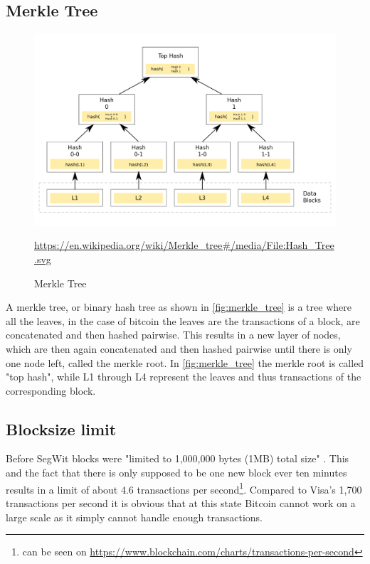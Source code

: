 \subsection{Merkle Tree}
\label{sec:Basics:MerkleTree}
\begin{figure}[!ht]
    \centering
    \includegraphics[width=(\textwidth * 2 / 3 )]{Ausarbeitung/images/merkle_tree.png}
    \caption[Merkle Tree]{Merkle Tree}
    \small \url{https://en.wikipedia.org/wiki/Merkle_tree#/media/File:Hash_Tree.svg} 
    \label{fig:merkle_tree}
\end{figure}
A merkle tree, or binary hash tree as shown in \autoref{fig:merkle_tree} is a tree where all the leaves, in the case of bitcoin the leaves are the transactions of a block, are concatenated and then hashed pairwise. This results in a new layer of nodes, which are then again concatenated and then hashed pairwise until there is only one node left, called the merkle root. In \autoref{fig:merkle_tree} the merkle root is called "top hash", while L1 through L4 represent the leaves and thus transactions of the corresponding block. \\



\subsection{Blocksize limit}
\label{sec:Basics:BlocksizeLimit}
Before SegWit blocks were "limited to 1,000,000 bytes (1MB) total size" \cite{bip-141}. This and the fact that there is only supposed to be one new block ever ten minutes \cite{nakamoto} results in a limit of about 4.6 transactions per second\footnote{can be seen on \url{https://www.blockchain.com/charts/transactions-per-second}}\cite{hackernoon}. Compared to Visa's 1,700 transactions per second \cite{hackernoon} it is obvious that at this state Bitcoin cannot work on a large scale as it simply cannot handle enough transactions.



